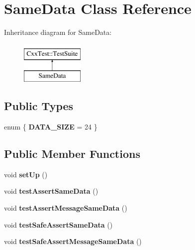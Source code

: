 \hypertarget{classSameData}{\section{Same\-Data Class Reference}
\label{classSameData}
}
Inheritance diagram for Same\-Data\-:\begin{figure}[H]
\begin{center}
\leavevmode
\includegraphics[height=2.000000cm]{classSameData}
\end{center}
\end{figure}
\subsection*{Public Types}
\begin{DoxyCompactItemize}
\item 
enum \{ {\bfseries D\-A\-T\-A\-\_\-\-S\-I\-Z\-E} = 24
 \}
\end{DoxyCompactItemize}
\subsection*{Public Member Functions}
\begin{DoxyCompactItemize}
\item 
\hypertarget{classSameData_a1d2b5935fed07dea1288220bef872f73}{void {\bfseries set\-Up} ()}\label{classSameData_a1d2b5935fed07dea1288220bef872f73}

\item 
\hypertarget{classSameData_a8c5aa0e39700f7786ac8328d41633d37}{void {\bfseries test\-Assert\-Same\-Data} ()}\label{classSameData_a8c5aa0e39700f7786ac8328d41633d37}

\item 
\hypertarget{classSameData_ad2359d68609a917c0cdf790b4c7e2a19}{void {\bfseries test\-Assert\-Message\-Same\-Data} ()}\label{classSameData_ad2359d68609a917c0cdf790b4c7e2a19}

\item 
\hypertarget{classSameData_a762e0dcd6f7b68ae574eabb6bcb2fd33}{void {\bfseries test\-Safe\-Assert\-Same\-Data} ()}\label{classSameData_a762e0dcd6f7b68ae574eabb6bcb2fd33}

\item 
\hypertarget{classSameData_a41cb51ae0994de40a7a03cdf6ecbedfe}{void {\bfseries test\-Safe\-Assert\-Message\-Same\-Data} ()}\label{classSameData_a41cb51ae0994de40a7a03cdf6ecbedfe}

\end{DoxyCompactItemize}
